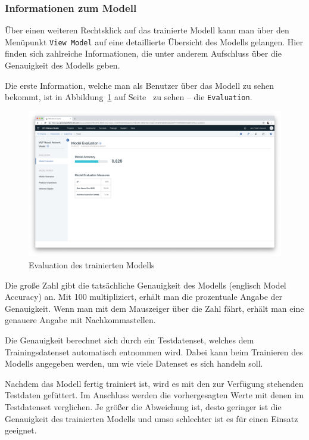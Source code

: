 \subsubsection{Informationen zum Modell}
Über einen weiteren Rechtsklick auf das trainierte Modell kann man über den Menüpunkt \texttt{View Model} auf eine
detaillierte Übersicht des Modells gelangen. Hier finden sich zahlreiche Informationen, die unter anderem Aufschluss
über die Genauigkeit des Modells geben.

Die erste Information, welche man als Benutzer über das Modell zu sehen bekommt, ist in
Abbildung~\ref{fig:umsetzung_model_evaluation} auf Seite~\pageref{fig:umsetzung_model_evaluation} zu sehen -- die
\texttt{Evaluation}.

\begin{figure}[h]
    \centering
    \includegraphics[width=\textwidth]{images/kapitel_3/model_evaluation.png}
    \caption{Evaluation des trainierten Modells}
    \label{fig:umsetzung_model_evaluation}
\end{figure}

Die große Zahl gibt die tatsächliche Genauigkeit des Modells (englisch Model Accuracy) an. Mit 100 multipliziert, erhält
man die prozentuale Angabe der Genauigkeit. Wenn man mit dem Mauszeiger über die Zahl fährt, erhält man eine genauere
Angabe mit Nachkommastellen.

Die Genauigkeit berechnet sich durch ein Testdatenset, welches dem Trainingsdatenset automatisch entnommen wird. Dabei
kann beim Trainieren des Modells angegeben werden, um wie viele Datenset es sich handeln soll.

Nachdem das Modell fertig trainiert ist, wird es mit den zur Verfügung stehenden Testdaten gefüttert. Im Anschluss
werden die vorhergesagten Werte mit denen im Testdatenset verglichen. Je größer die Abweichung ist, desto geringer ist
die Genauigkeit des trainierten Modells und umso schlechter ist es für einen Einsatz geeignet.

